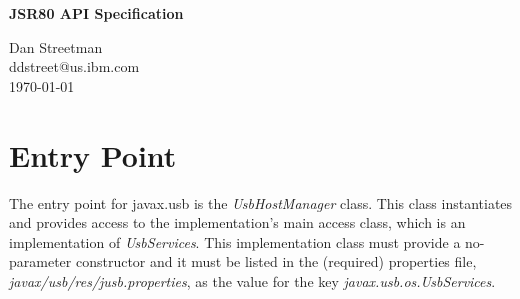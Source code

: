 \documentclass{article}
\begin{document}
\pagestyle{empty}

\newcommand{\mytitle}[0]{JSR80 API Specification}
\newcommand{\myauthor}[0]{Dan Streetman}

%

\begin{titlepage}

\begin{center}
\Huge{\textbf{\mytitle}}
\end{center}

\vfill
\vfill

\begin{flushright}
\large{\myauthor}
\\
\large{ddstreet@us.ibm.com}
\\
\large{\today}
\end{flushright}

\vfill

\end{titlepage}

\newpage


%

\pagestyle{fancy}
\fancyhf{}
\renewcommand{\sectionmark}[1]{\markright{\emph{\mytitle}}}
\renewcommand{\subsectionmark}[1]{\markright{\emph{\mytitle}}}
\renewcommand{\subsubsectionmark}[1]{\markright{\emph{\mytitle}}}
\fancyhead[LE,RO]{\bfseries\thepage}
\fancyhead[LO]{\rightmark}


%

\tableofcontents

\listoftables

\listoffigures

\newpage

%

\section{Entry Point}

The entry point for javax.usb is the \emph{UsbHostManager} class.  This class instantiates
and provides access to the implementation's main access class, which is an implementation of
\emph{UsbServices}.  This implementation class must provide a no-parameter constructor
and it must be listed in the (required) properties file, \emph{javax/usb/res/jusb.properties},
as the value for the key \emph{javax.usb.os.UsbServices}.
\end{document}
